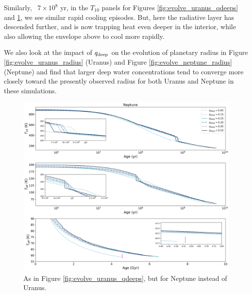 \documentclass[11pt]{ucscthesisbs}
\begin{document}
Similarly, ~$7 \times 10^8$ yr, in the $T_{10}$ panels for Figures \ref{fig:evolve_uranus_qdeeps} and \ref{fig:evolve_neptune_qdeeps}, we see similar rapid cooling episodes. But, here the radiative layer has descended further, and is now trapping heat even deeper in the interior, while also allowing the envelope above to cool more rapidly.

We also look at the impact of $q_{\rm deep}$ on the evolution of planetary radius in Figure \ref{fig:evolve_uranus_radius} (Uranus) and Figure \ref{fig:evolve_neptune_radius} (Neptune) and find that larger deep water concentrations tend to converge more closely toward the presently observed radius for both Uranus and Neptune in these simulations. 
\begin{figure}[h]
 \centerline{
  \includegraphics[width=\columnwidth]{figures/n_cooling_curves_nz_4096_more_qdeeps.png}
 }
\caption[Thermal Evolution Curves for Neptune - Water Vapor Concentration Comparisons]
{As in Figure \ref{fig:evolve_uranus_qdeeps}, but for Neptune instead of Uranus.}
\label{fig:evolve_neptune_qdeeps}
\end{figure}
\end{document}
